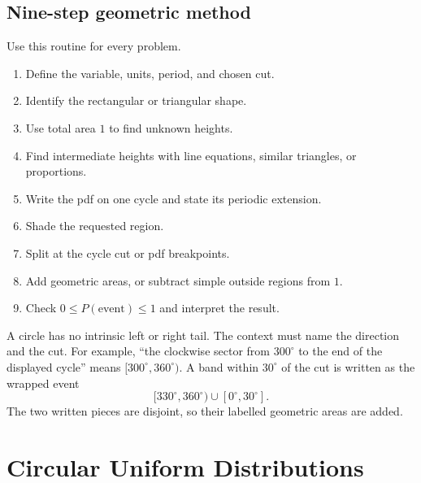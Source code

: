 	\subsection{Nine-step geometric method}\label{sec:c3-intro-method}
	Use this routine for every problem.
	\begin{enumerate}
		\item Define the variable, units, period, and chosen cut.\par
		\item Identify the rectangular or triangular shape.\par
		\item Use total area $1$ to find unknown heights.\par
		\item Find intermediate heights with line equations, similar triangles, or
		proportions.\par
		\item Write the pdf on one cycle and state its periodic extension.\par
		\item Shade the requested region.\par
		\item Split at the cycle cut or pdf breakpoints.\par
		\item Add geometric areas, or subtract simple outside regions from $1$.\par
		\item Check $0\le P(\text{event})\le1$ and interpret the result.\par
	\end{enumerate}
	
	A circle has no intrinsic left or right tail.  The context must name the
	direction and the cut.  For example, ``the clockwise sector from $300^\circ$
	to the end of the displayed cycle'' means $[300^\circ,360^\circ)$.  A band
	within $30^\circ$ of the cut is written as the wrapped event
	\[
	[330^\circ,360^\circ)\cup[0^\circ,30^\circ].
	\]
	The two written pieces are disjoint, so their labelled geometric areas are
	added.
	
	\section{Circular Uniform Distributions}\label{sec:c3-uniform}
	
